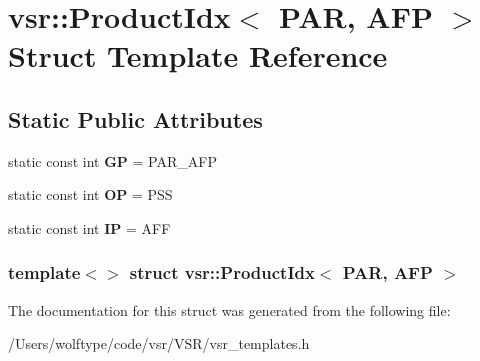 \hypertarget{structvsr_1_1_product_idx_3_01_p_a_r_00_01_a_f_p_01_4}{\section{vsr\-:\-:Product\-Idx$<$ P\-A\-R, A\-F\-P $>$ Struct Template Reference}
\label{structvsr_1_1_product_idx_3_01_p_a_r_00_01_a_f_p_01_4}
}
\subsection*{Static Public Attributes}
\begin{DoxyCompactItemize}
\item 
\hypertarget{structvsr_1_1_product_idx_3_01_p_a_r_00_01_a_f_p_01_4_aea278fe6e8baa5e60d3bacff20c1fd3c}{static const int {\bfseries G\-P} = P\-A\-R\-\_\-\-A\-F\-P}\label{structvsr_1_1_product_idx_3_01_p_a_r_00_01_a_f_p_01_4_aea278fe6e8baa5e60d3bacff20c1fd3c}

\item 
\hypertarget{structvsr_1_1_product_idx_3_01_p_a_r_00_01_a_f_p_01_4_a6ea192d8e08800d650f0dfdd08ebee57}{static const int {\bfseries O\-P} = P\-S\-S}\label{structvsr_1_1_product_idx_3_01_p_a_r_00_01_a_f_p_01_4_a6ea192d8e08800d650f0dfdd08ebee57}

\item 
\hypertarget{structvsr_1_1_product_idx_3_01_p_a_r_00_01_a_f_p_01_4_a59a93e54d144531a63477277b4f0e612}{static const int {\bfseries I\-P} = A\-F\-F}\label{structvsr_1_1_product_idx_3_01_p_a_r_00_01_a_f_p_01_4_a59a93e54d144531a63477277b4f0e612}

\end{DoxyCompactItemize}
\subsubsection*{template$<$$>$ struct vsr\-::\-Product\-Idx$<$ P\-A\-R, A\-F\-P $>$}



The documentation for this struct was generated from the following file\-:\begin{DoxyCompactItemize}
\item 
/\-Users/wolftype/code/vsr/\-V\-S\-R/vsr\-\_\-templates.\-h\end{DoxyCompactItemize}
